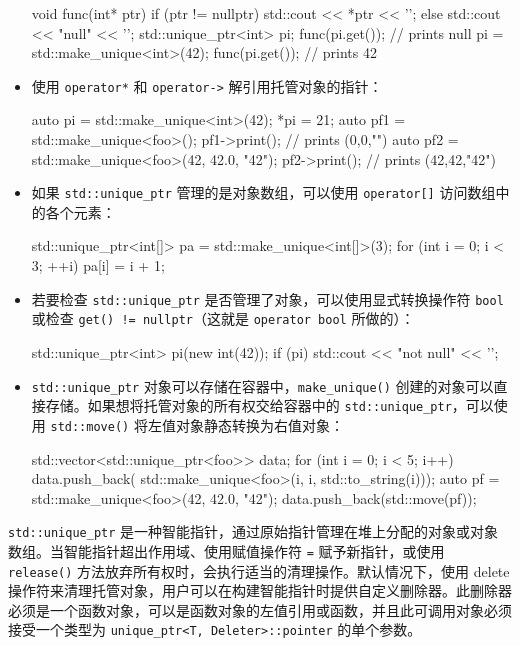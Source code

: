 \begin{itemize}
\begin{cpp}
void func(int* ptr)
{
    if (ptr != nullptr)
        std::cout << *ptr << '\n';
    else
        std::cout << "null" << '\n';
}
std::unique_ptr<int> pi;
func(pi.get()); // prints null
pi = std::make_unique<int>(42);
func(pi.get()); // prints 42
\end{cpp}

\item
使用 \verb|operator*| 和 \verb|operator->| 解引用托管对象的指针：

\begin{cpp}
auto pi = std::make_unique<int>(42);
*pi = 21;
auto pf1 = std::make_unique<foo>();
pf1->print(); // prints (0,0,"")
auto pf2 = std::make_unique<foo>(42, 42.0, "42");
pf2->print(); // prints (42,42,"42")
\end{cpp}

\item
如果 \verb|std::unique_ptr| 管理的是对象数组，可以使用 \verb|operator[]| 访问数组中的各个元素：

\begin{cpp}
std::unique_ptr<int[]> pa = std::make_unique<int[]>(3);
for (int i = 0; i < 3; ++i)
    pa[i] = i + 1;
\end{cpp}

\item
若要检查 \verb|std::unique_ptr| 是否管理了对象，可以使用显式转换操作符 \verb|bool| 或检查 \verb|get() != nullptr|（这就是 \verb|operator bool| 所做的）：

\begin{cpp}
std::unique_ptr<int> pi(new int(42));
if (pi) std::cout << "not null" << '\n';
\end{cpp}

\item
\verb|std::unique_ptr| 对象可以存储在容器中，\verb|make_unique()| 创建的对象可以直接存储。如果想将托管对象的所有权交给容器中的 \verb|std::unique_ptr|，可以使用 \verb|std::move()| 将左值对象静态转换为右值对象：

\begin{cpp}
std::vector<std::unique_ptr<foo>> data;
for (int i = 0; i < 5; i++)
    data.push_back(
std::make_unique<foo>(i, i, std::to_string(i)));
auto pf = std::make_unique<foo>(42, 42.0, "42");
data.push_back(std::move(pf));
\end{cpp}
\end{itemize}


\verb|std::unique_ptr| 是一种智能指针，通过原始指针管理在堆上分配的对象或对象数组。当智能指针超出作用域、使用赋值操作符 \verb|=| 赋予新指针，或使用 \verb|release()| 方法放弃所有权时，会执行适当的清理操作。默认情况下，使用 delete 操作符来清理托管对象，用户可以在构建智能指针时提供自定义删除器。此删除器必须是一个函数对象，可以是函数对象的左值引用或函数，并且此可调用对象必须接受一个类型为 \verb|unique_ptr<T, Deleter>::pointer| 的单个参数。

